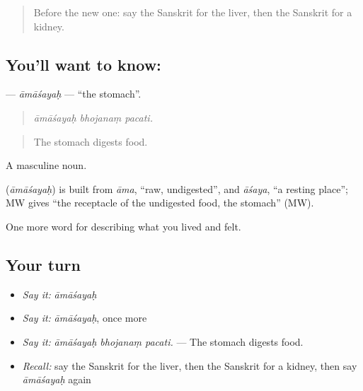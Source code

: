 \label{lesson:SA-C470-amasayah}



\begin{quote}
Before the new one: say the Sanskrit for the liver, then the Sanskrit for a kidney.
\end{quote}

\subsection*{You'll want to know: }
\textbf{} — \emph{āmāśayaḥ} — \textquotedblleft{}the stomach\textquotedblright{}.

\begin{quote}
  
\end{quote}

\begin{quote}
\emph{āmāśayaḥ bhojanaṃ pacati.}
\end{quote}

\begin{quote}
The stomach digests food.
\end{quote}

A masculine noun.

\begin{cousinweb}
\textbf{} (\emph{āmāśayaḥ}) is built from \emph{āma}, \textquotedblleft{}raw, undigested\textquotedblright{}, and \emph{āśaya}, \textquotedblleft{}a resting place\textquotedblright{}; MW gives \textquotedblleft{}the receptacle of the undigested food, the stomach\textquotedblright{} (MW).
\end{cousinweb}

\begin{grammarlens}[title={What you've built}]
One more word for describing what you lived and felt.
\end{grammarlens}

\subsection*{Your turn}
\begin{itemize}
\raggedright
  \item \emph{Say it:} \emph{āmāśayaḥ}
  \item \emph{Say it:} \emph{āmāśayaḥ}, once more
  \item \emph{Say it:} \emph{āmāśayaḥ bhojanaṃ pacati.} — The stomach digests food.
  \item \emph{Recall:} say the Sanskrit for the liver, then the Sanskrit for a kidney, then say \emph{āmāśayaḥ} again
\end{itemize}

